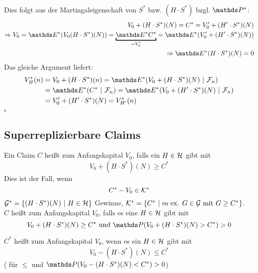 \\
Dies folgt aus der Martingaleigenschaft von $S^*$ bzw. $(H\cdot S^*)$ bzgl. $\Pw^*$:
\begin{equation*}
\begin{aligned}
	V_0+(H\cdot S^*)(N)=C^*=V_0'+(H'\cdot S^*)(N)\\
	\Rightarrow V_0=\E^*(V_0(H\cdot S^*)(N))=\underbracket{\E^*C^*}_{=V_0'}=\E^*(V_0'+(H'\cdot S^*)(N))\\
	\Rightarrow \E^*(H\cdot S^*)(N)=0
\end{aligned}
\end{equation*} 
Das gleiche Argument liefert:
\begin{equation*}
\begin{aligned}
	V_H^*(n) &= V_0+(H\cdot S^*)(n)=\E^*(V_0+(H\cdot S^*)(N)~|~\F_n)\\
	&= \E^*(C^*~|~\F_n)=\E^*(V_0+(H'\cdot S^*)(N)~|~\F_n)\\
	&= V_0'+(H'\cdot S^*)(N)= V_{H'}^*(n)
\end{aligned}
\end{equation*}
\hfill $\square$

\subsection{Superreplizierbare Claims}
\label{sub:superrepl_claims}
Ein Claim $C$ heißt  zum Anfangskapital $V_0$, falls ein $H\in\mathcal{H}$ gibt mit
\[
V_0+(H\cdot S^*)(N)\ge C^*
\]
Dies ist der Fall, wenn
\[
C^*-V_0\in \mathcal{K}^*
\]
$\mathcal{G}^*=\{(H\cdot S^*)(N)~|~H\in\mathcal{H}\}$ Gewinne, $\mathcal{K}^*=\{C^*~|~\text{es ex. }G\in\mathcal{G}\text{ mit }G\ge C^* \}$.\\
$C$ heißt  zum Anfangskapital $V_0$, falls es eine $H\in \mathcal{H}$ gibt mit
\[
V_0+(H\cdot S^*)(N)\ge C^*\text{ und }\Pw(V_0+(H\cdot S^*)(N)>C^*)>0
\]

$C^*$ heißt  zum Anfangskapital $V_0$, wenn es ein $H\in \mathcal{H}$ gibt mit
\[
V_0-(H\cdot S^*)(N)\le C^*
\]
( für $\le$ und $\Pw(V_0-(H\cdot S^*)(N)<C^*)>0$)

